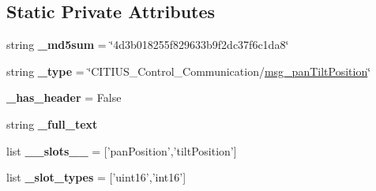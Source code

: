 \subsection*{\-Static \-Private \-Attributes}
\begin{DoxyCompactItemize}
\item 
\hypertarget{class_c_i_t_i_u_s___control___communication_1_1msg_1_1__msg__pan_tilt_position_1_1msg__pan_tilt_position_a8c45a5391b50746f5662c79e679b9d86}{string {\bfseries \-\_\-md5sum} = \char`\"{}4d3b018255f829633b9f2dc37f6c1da8\char`\"{}}\label{class_c_i_t_i_u_s___control___communication_1_1msg_1_1__msg__pan_tilt_position_1_1msg__pan_tilt_position_a8c45a5391b50746f5662c79e679b9d86}

\item 
\hypertarget{class_c_i_t_i_u_s___control___communication_1_1msg_1_1__msg__pan_tilt_position_1_1msg__pan_tilt_position_af3fa78ff4f01007edcdc8ce84881d41a}{string {\bfseries \-\_\-type} = \char`\"{}\-C\-I\-T\-I\-U\-S\-\_\-\-Control\-\_\-\-Communication/\hyperlink{class_c_i_t_i_u_s___control___communication_1_1msg_1_1__msg__pan_tilt_position_1_1msg__pan_tilt_position}{msg\-\_\-pan\-Tilt\-Position}\char`\"{}}\label{class_c_i_t_i_u_s___control___communication_1_1msg_1_1__msg__pan_tilt_position_1_1msg__pan_tilt_position_af3fa78ff4f01007edcdc8ce84881d41a}

\item 
\hypertarget{class_c_i_t_i_u_s___control___communication_1_1msg_1_1__msg__pan_tilt_position_1_1msg__pan_tilt_position_a6a47546e81cd29fd5ffc81a8e7e60549}{{\bfseries \-\_\-has\-\_\-header} = \-False}\label{class_c_i_t_i_u_s___control___communication_1_1msg_1_1__msg__pan_tilt_position_1_1msg__pan_tilt_position_a6a47546e81cd29fd5ffc81a8e7e60549}

\item 
string {\bfseries \-\_\-full\-\_\-text}
\item 
\hypertarget{class_c_i_t_i_u_s___control___communication_1_1msg_1_1__msg__pan_tilt_position_1_1msg__pan_tilt_position_a9c4a8f53799fe7291dc94b8e81a7e538}{list {\bfseries \-\_\-\-\_\-slots\-\_\-\-\_\-} = \mbox{[}'pan\-Position','tilt\-Position'\mbox{]}}\label{class_c_i_t_i_u_s___control___communication_1_1msg_1_1__msg__pan_tilt_position_1_1msg__pan_tilt_position_a9c4a8f53799fe7291dc94b8e81a7e538}

\item 
\hypertarget{class_c_i_t_i_u_s___control___communication_1_1msg_1_1__msg__pan_tilt_position_1_1msg__pan_tilt_position_a8a813bb465ff0a8f92ef4a43e8b97d84}{list {\bfseries \-\_\-slot\-\_\-types} = \mbox{[}'uint16','int16'\mbox{]}}\label{class_c_i_t_i_u_s___control___communication_1_1msg_1_1__msg__pan_tilt_position_1_1msg__pan_tilt_position_a8a813bb465ff0a8f92ef4a43e8b97d84}

\end{DoxyCompactItemize}


